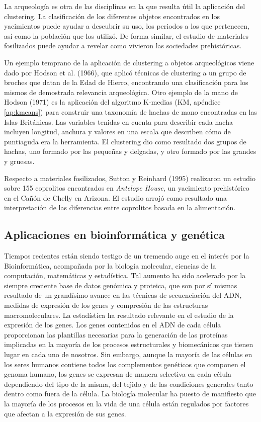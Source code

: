La arqueología es otra de las disciplinas en la que resulta útil la aplicación del clustering. La clasificación de los diferentes objetos encontrados en los yacimientos puede ayudar a descubrir su uso, los periodos a los que pertenecen, así como la población que los utilizó. De forma similar, el estudio de materiales fosilizados puede ayudar a revelar como vivieron las sociedades prehistóricas. 

Un ejemplo temprano de la aplicación de clustering a objetos arqueológicos viene dado por Hodson et al. (1966), que aplicó técnicas de clustering a un grupo de broches que datan de la Edad de Hierro, encontrando una clasificación para los mismos de demostrada relevancia arqueológica. Otro ejemplo de la mano de Hodson (1971) es la aplicación del algoritmo K-medias (\acs{KM}, apéndice \ref{ap:kmeans}) para construir una taxonomía de hachas de mano encontradas en las Islas Británicas. Las variables tenidas en cuenta para describir cada hacha incluyen longitud, anchura y valores en una escala que describen cómo de puntiaguda era la herramienta. El clustering dio como resultado dos grupos de hachas, uno formado por las pequeñas y delgadas, y otro formado por las grandes y gruesas.

Respecto a materiales fosilizados, Sutton y Reinhard (1995) realizaron un estudio sobre 155 coprolitos encontrados en \textit{Antelope House}, un yacimiento prehistórico en el Cañón de Chelly en Arizona. El estudio arrojó como resultado una interpretación de las diferencias entre coprolitos basada en la alimentación.

\subsection{Aplicaciones en bioinformática y genética}

Tiempos recientes están siendo testigo de un tremendo auge en el interés por la Bioinformática, acompañada por la biología molecular, ciencias de la computación, matemáticas y estadística. Tal aumento ha sido acelerado por la siempre creciente base de datos genómica y proteica, que son por sí mismas resultado de un grandísimo avance en las técnicas de secuenciación del ADN, medidas de expresión de los genes y compresión de las estructuras macromoleculares. La estadística ha resultado relevante en el estudio de la expresión de los genes. Los genes contenidos en el ADN de cada célula proporcionan las plantillas necesarias para la generación de las proteínas implicadas en la mayoría de los procesos estructurales y biomecánicos que tienen lugar en cada uno de nosotros. Sin embargo, aunque la mayoría de las células en los seres humanos contiene todos los complementos genéticos que componen el genoma humano, los genes se expresan de manera selectiva en cada célula dependiendo del tipo de la misma, del tejido y de las condiciones generales tanto dentro como fuera de la célula. La biología molecular ha puesto de manifiesto que la mayoría de los procesos en la vida de una célula están regulados por factores que afectan a la expresión de sus genes.

